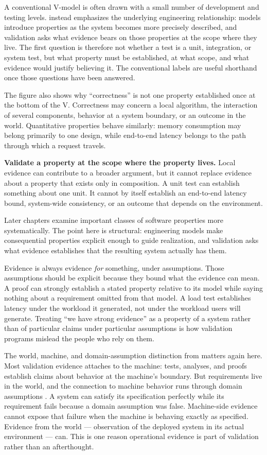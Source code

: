 A conventional V-model is often drawn with a small number of development and testing levels.
\citet{fig-models-evidence-v} instead emphasizes the underlying engineering relationship: models introduce
properties as the system becomes more precisely described, and validation asks what evidence bears
on those properties at the scope where they live. The first question is therefore not whether a
test is a unit, integration, or system test, but what property must be established, at what scope,
and what evidence would justify believing it. The conventional labels are useful shorthand once
those questions have been answered.

The figure also shows why ``correctness'' is not one property established once at the bottom of the V.
Correctness may concern a local algorithm, the interaction of several components, behavior at a
system boundary, or an outcome in the world. Quantitative properties behave similarly: memory
consumption may belong primarily to one design, while end-to-end latency belongs to the path through
which a request travels.

\textbf{Validate a property at the scope where the property lives.} Local evidence can contribute to a
broader argument, but it cannot replace evidence about a property that exists only in composition. A
unit test can establish something about one unit. It cannot by itself establish an end-to-end latency
bound, system-wide consistency, or an outcome that depends on the environment.

Later chapters examine important classes of software properties more systematically. The point here
is structural: engineering models make consequential properties explicit enough to guide
realization, and validation asks what evidence establishes that the resulting system actually has
them.

Evidence is always evidence \emph{for} something, under assumptions. Those assumptions should be
explicit because they bound what the evidence can mean. A proof can strongly establish a stated
property relative to its model while saying nothing about a requirement omitted from that model. A
load test establishes latency under the workload it generated, not under the workload users will
generate. Treating ``we have strong evidence'' as a property of a system rather than of particular
claims under particular assumptions is how validation programs mislead the people who rely on them.

The world, machine, and domain-assumption distinction from \citet{ch-specification} matters again here.
Most validation evidence attaches to the machine: tests, analyses, and proofs establish claims
about behavior at the machine's boundary. But requirements live in the world, and the connection to
machine behavior runs through domain assumptions \citep{zave1997darkcorners}. A system can satisfy its
specification perfectly while its requirement fails because a domain assumption was false.
Machine-side evidence cannot expose that failure when the machine is behaving exactly as specified.
Evidence from the world --- observation of the deployed system in its actual environment --- can. This
is one reason operational evidence is part of validation rather than an afterthought.

